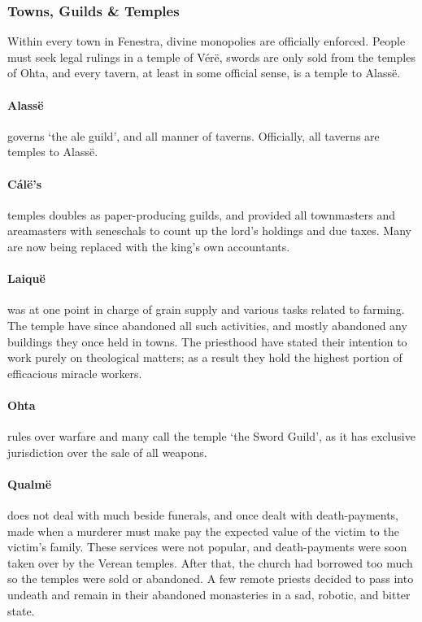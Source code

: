 \begin{multicols}{2}
\subsubsection{Towns, Guilds \& Temples}
\label{guilds}

Within every town in Fenestra, divine monopolies are officially enforced.
People must seek legal rulings in a temple of V\'{e}r\"{e}, swords are only sold from the temples of Ohta, and every tavern, at least in some official sense, is a temple to Alass\"{e}.

\paragraph{Alass\"{e}} governs `the ale guild', and all manner of taverns.  Officially, all taverns are temples to Alass\"{e}.

\paragraph{C\'{a}l\"{e}'s} temples doubles as paper-producing guilds, and provided all townmasters and areamasters with seneschals to count up the lord's holdings and due taxes.
Many are now being replaced with the \gls{king}'s own accountants.

\paragraph{Laiqu\"{e}} was at one point in charge of grain supply and various tasks related to farming.
The temple have since abandoned all such activities, and mostly abandoned any buildings they once held in towns.
The priesthood have stated their intention to work purely on theological matters; as a result they hold the highest portion of efficacious miracle workers.

\paragraph{Ohta} rules over warfare and many call the temple `the Sword Guild', as it has exclusive jurisdiction over the sale of all weapons.

\paragraph{Qualm\"{e}} does not deal with much beside funerals, and once dealt with death-payments, made when a murderer must make pay the expected value of the victim to the victim's family.
These services were not popular, and death-payments were soon taken over by the Verean temples.
After that, the church had borrowed too much so the temples were sold or abandoned.
A few remote priests decided to pass into undeath and remain in their abandoned monasteries in a sad, robotic, and bitter state.


\end{multicols}
